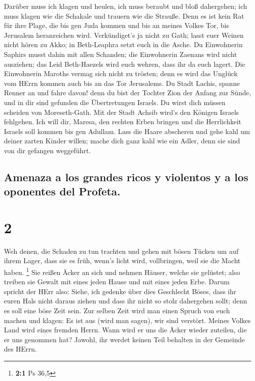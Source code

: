  Darüber muss ich klagen und heulen, ich muss beraubt und
bloß dahergehen; ich muss klagen wie die Schakale und trauern wie die
Strauße.  Denn es ist kein Rat für ihre Plage, die bis gen
Juda kommen und bis an meines Volkes Tor, bis Jerusalem heranreichen
wird.  Verkündiget's ja nicht zu Gath; lasst euer Weinen
nicht hören zu Akko; in Beth-Leaphra setzt euch in die Asche.
 Du Einwohnerin Saphirs musst dahin mit allen Schanden;
die Einwohnerin Zaenans wird nicht ausziehen; das Leid Beth-Haezels wird
euch wehren, dass ihr da euch lagert.  Die Einwohnerin
Maroths vermag sich nicht zu trösten; denn es wird das Unglück vom HErrn
kommen auch bis an das Tor Jerusalems.  Du Stadt Lachis,
spanne Renner an und fahre davon! denn du bist der Tochter Zion der
Anfang zur Sünde, und in dir sind gefunden die Übertretungen Israels.
 Du wirst dich müssen scheiden von Moreseth-Gath. Mit der
Stadt Achsib wird's den Königen Israels fehlgehen.  Ich
will dir, Maresa, den rechten Erben bringen und die Herrlichkeit Israels
soll kommen bis gen Adullam.  Lass die Haare abscheren
und gehe kahl um deiner zarten Kinder willen; mache dich ganz kahl wie
ein Adler, denn sie sind von dir gefangen weggeführt.

\hypertarget{amenaza-a-los-grandes-ricos-y-violentos-y-a-los-oponentes-del-profeta.}{%
\subsection{Amenaza a los grandes ricos y violentos y a los oponentes
del
Profeta.}\label{amenaza-a-los-grandes-ricos-y-violentos-y-a-los-oponentes-del-profeta.}}

\hypertarget{section-1}{%
\section{2}\label{section-1}}

 Weh denen, die Schaden zu tun trachten und gehen mit
bösen Tücken um auf ihrem Lager, dass sie es früh, wenn's licht wird,
vollbringen, weil sie die Macht haben. \footnote{\textbf{2:1} Ps 36,5}
 Sie reißen Äcker an sich und nehmen Häuser, welche sie
gelüstet; also treiben sie Gewalt mit eines jeden Hause und mit eines
jeden Erbe.  Darum spricht der HErr also: Siehe, ich
gedenke über dies Geschlecht Böses, dass ihr euren Hals nicht daraus
ziehen und dass ihr nicht so stolz dahergehen sollt; denn es soll eine
böse Zeit sein.  Zur selben Zeit wird man einen Spruch von
euch machen und klagen: Es ist aus (wird man sagen), wir sind verstört.
Meines Volkes Land wird eines fremden Herrn. Wann wird er uns die Äcker
wieder zuteilen, die er uns genommen hat?  Jawohl, ihr
werdet keinen Teil behalten in der Gemeinde des HErrn.

